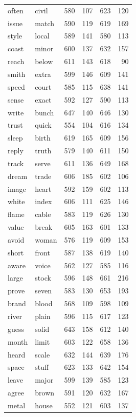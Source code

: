 \documentclass[
]{interact}
\begin{document}
\begin{longtable*}{llrrrr}
often & civil & 580 & 107 & 623 & 120 \\ 
issue & match & 590 & 119 & 619 & 169 \\ 
style & local & 589 & 141 & 580 & 113 \\ 
coast & minor & 600 & 137 & 632 & 157 \\ 
reach & below & 611 & 143 & 618 & 90 \\ 
smith & extra & 599 & 146 & 609 & 141 \\ 
speed & court & 585 & 115 & 638 & 141 \\ 
sense & exact & 592 & 127 & 590 & 113 \\ 
write & bunch & 647 & 140 & 646 & 130 \\ 
trust & quick & 554 & 104 & 616 & 134 \\ 
sleep & birth & 619 & 165 & 609 & 156 \\ 
reply & truth & 579 & 140 & 611 & 150 \\ 
track & serve & 611 & 136 & 649 & 168 \\ 
dream & trade & 606 & 185 & 602 & 106 \\ 
image & heart & 592 & 159 & 602 & 113 \\ 
white & index & 606 & 111 & 625 & 146 \\ 
flame & cable & 583 & 119 & 626 & 130 \\ 
value & break & 605 & 163 & 601 & 133 \\ 
avoid & woman & 576 & 119 & 609 & 153 \\ 
short & front & 587 & 138 & 619 & 140 \\ 
aware & voice & 562 & 127 & 585 & 116 \\ 
large & stock & 596 & 148 & 661 & 216 \\ 
prove & seven & 583 & 130 & 653 & 193 \\ 
brand & blood & 568 & 109 & 598 & 109 \\ 
river & plain & 596 & 115 & 617 & 123 \\ 
guess & solid & 643 & 158 & 612 & 140 \\ 
month & limit & 603 & 122 & 658 & 136 \\ 
heard & scale & 632 & 144 & 639 & 176 \\ 
space & stuff & 623 & 133 & 642 & 154 \\ 
leave & major & 599 & 139 & 585 & 123 \\ 
agree & brown & 591 & 120 & 632 & 167 \\ 
metal & house & 552 & 121 & 603 & 137 \\ 

\end{longtable*}
\end{document}
